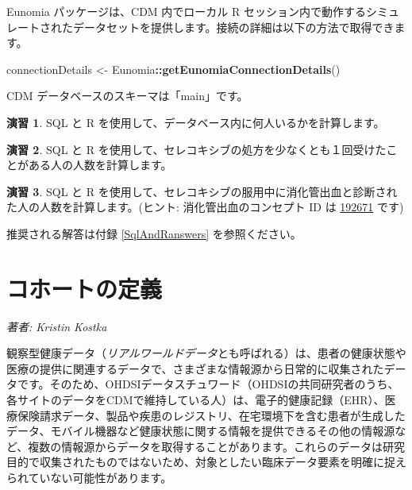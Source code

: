 \documentclass[
  11pt]{book}
\newenvironment{Shaded}{\begin{snugshade}}{\end{snugshade}}
\newcommand{\FunctionTok}[1]{\textcolor[rgb]{0.13,0.29,0.53}{\textbf{#1}}}
\newcommand{\NormalTok}[1]{#1}
\newcommand{\OtherTok}[1]{\textcolor[rgb]{0.56,0.35,0.01}{#1}}
\newcommand{\SpecialCharTok}[1]{\textcolor[rgb]{0.81,0.36,0.00}{\textbf{#1}}}
\theoremstyle{definition}
\theoremstyle{definition}
\theoremstyle{definition}
\newtheorem{exercise}{演習}[chapter]
\theoremstyle{definition}
\theoremstyle{remark}
\begin{document}
Eunomia パッケージは、CDM 内でローカル R セッション内で動作するシミュレートされたデータセットを提供します。接続の詳細は以下の方法で取得できます。

\begin{Shaded}
\begin{Highlighting}[]
\NormalTok{connectionDetails }\OtherTok{\textless{}{-}}\NormalTok{ Eunomia}\SpecialCharTok{::}\FunctionTok{getEunomiaConnectionDetails}\NormalTok{()}
\end{Highlighting}
\end{Shaded}

CDM データベースのスキーマは「main」です。

\begin{exercise}
\protect\hypertarget{exr:exercisePeopleCount}{}\label{exr:exercisePeopleCount}SQL と R を使用して、データベース内に何人いるかを計算します。
\end{exercise}

\begin{exercise}
\protect\hypertarget{exr:exerciseCelecoxibUsers}{}\label{exr:exerciseCelecoxibUsers}SQL と R を使用して、セレコキシブの処方を少なくとも１回受けたことがある人の人数を計算します。
\end{exercise}

\begin{exercise}
\protect\hypertarget{exr:exerciseGiBleedsDuringCelecoxib}{}\label{exr:exerciseGiBleedsDuringCelecoxib}SQL と R を使用して、セレコキシブの服用中に消化管出血と診断された人の人数を計算します。(ヒント: 消化管出血のコンセプト ID は \href{http://athena.ohdsi.org/search-terms/terms/192671}{192671} です)
\end{exercise}

推奨される解答は付録 \ref{SqlAndRanswers} を参照ください。

\chapter{コホートの定義}\label{Cohorts}

\emph{著者: Kristin Kostka}

観察型健康データ（\emph{リアルワールドデータ}とも呼ばれる）は、患者の健康状態や医療の提供に関連するデータで、さまざまな情報源から日常的に収集されたデータです。そのため、OHDSIデータスチュワード（OHDSIの共同研究者のうち、各サイトのデータをCDMで維持している人）は、電子的健康記録（EHR）、医療保険請求データ、製品や疾患のレジストリ、在宅環境下を含む患者が生成したデータ、モバイル機器など健康状態に関する情報を提供できるその他の情報源など、複数の情報源からデータを取得することがあります。これらのデータは研究目的で収集されたものではないため、対象としたい臨床データ要素を明確に捉えられていない可能性があります。
\end{document}
